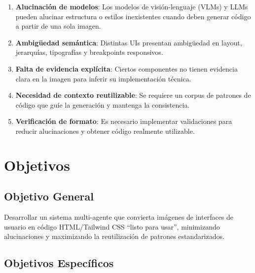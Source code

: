 \documentclass[12pt,a4paper]{article}
\begin{document}
\begin{enumerate}
    \item \textbf{Alucinación de modelos}: Los modelos de visión-lenguaje (VLMs) y LLMs pueden alucinar estructura o estilos inexistentes cuando deben generar código a partir de una sola imagen.
    
    \item \textbf{Ambigüedad semántica}: Distintas UIs presentan ambigüedad en layout, jerarquías, tipografías y breakpoints responsivos.
    
    \item \textbf{Falta de evidencia explícita}: Ciertos componentes no tienen evidencia clara en la imagen para inferir su implementación técnica.
    
    \item \textbf{Necesidad de contexto reutilizable}: Se requiere un corpus de patrones de código que guíe la generación y mantenga la consistencia.
    
    \item \textbf{Verificación de formato}: Es necesario implementar validaciones para reducir alucinaciones y obtener código realmente utilizable.
\end{enumerate}

\section{Objetivos}

\subsection{Objetivo General}

Desarrollar un sistema multi-agente que convierta imágenes de interfaces de usuario en código HTML/Tailwind CSS ``listo para usar'', minimizando alucinaciones y maximizando la reutilización de patrones estandarizados.

\subsection{Objetivos Específicos}
\end{document}
